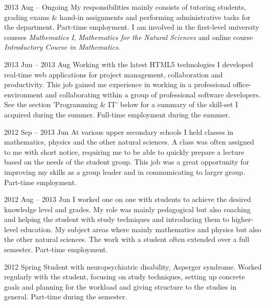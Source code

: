 
      {2013 Aug -- Ongoing}
      {My responsibilities mainly consists of tutoring students, grading exams \& hand-in assignments and
       performing administrative tasks for the department. Part-time employment.
       I am involved in the first-level university courses \emph{Mathematics I},
       \emph{Mathematics for the Natural Sciences} and online course \emph{Introductory Course in Mathematics}.}

      {2013 Jun -- 2013 Aug}
      {Working with the latest HTML5 technologies I developed real-time
       web applications for project management, collaboration and productivity.
       This job gained me experience in working in a professional office-environment
       and collaborating within a group of professional software developers.
       See the section 'Programming \& IT' below for a summary of the skill-set I acquired during the summer.
       Full-time employment during the summer.}

      {2012 Sep -- 2013 Jun}
      {At various upper secondary schools I held classes in
       mathematics, physics and the other natural sciences.
       A class was often assigned to me with
       short notice, requiring me to be able to quickly prepare a lecture
       based on the needs of the student group. This job was a great
       opportunity for improving my skills as a group leader and in
       communicating to larger group. Part-time employment.}

      {2012 Aug -- 2013 Jun}
      {I worked one on one with students to achieve the desired knowledge level and
       grades. My role was mainly pedagogical but also coaching and helping
       the student with study techniques and introducing them to higher-level
       education. My subject areas where mainly mathematics and physics but also the
       other natural sciences. The work with a student often extended over a full semester.
       Part-time employment.}


      {2012 Spring}
      {Student with neuropsychiatric disability, Asperger syndrome.
       Worked regularly with the student, focusing on study techniques,
       setting up concrete goals and planning for the workload and giving
       structure to the studies in general. Part-time during the semester.}
